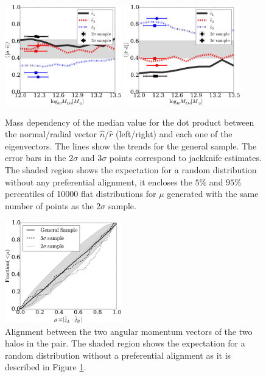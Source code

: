 \documentclass{emulateapj}
\begin{document}
\begin{figure}
\begin{center}
  \includegraphics[width=0.45\textwidth]{fig5.pdf}
  \includegraphics[width=0.45\textwidth]{fig5b.pdf}
\caption{Mass dependency of the median value for the dot product
  between the normal/radial vector $\hat{n}$/$\hat{r}$ (left/right)
  and each one of the  eigenvectors.  The lines show the trends for
  the general sample. The error bars in the 2$\sigma$ and 3$\sigma$ points
  correspond to jackknife estimates. 
  The shaded region shows the expectation for a random distribution
 without any preferential alignment, it encloses the $5\%$ and $95\%$
 percentiles of 10000  flat distributions for $\mu$ generated with the
 same number of points as the $2\sigma$ sample.   
\label{fig:median_alignment_n}}
\end{center}
\end{figure}



\begin{figure}
\begin{center}
  \includegraphics[width=0.45\textwidth]{fig6.pdf}
\end{center}
\caption{Alignment between the two angular momentum vectors of the two
  halos in the pair.
  The shaded region shows the expectation for a random
  distribution without a preferential alignment as it is described in
  Figure \ref{fig:median_alignment_n}.
    \label{fig:jj_alignment}}  
\end{figure}
\end{document}
